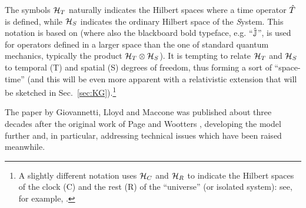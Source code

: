 The symbols $\mathcal{H}_T$ %
naturally indicates
the Hilbert spaces where a time operator $\hat{T}$ is defined,
while $\mathcal{H}_S$ indicates
the ordinary Hilbert space of the \emph{S}ystem.
This notation is based on \citereset\cite{Lloyd:Time}
(where also the blackboard bold typeface, e.g. ``$\hat{\mathbb{J}}$'',
is used for operators defined in a larger space
than the one of standard quantum mechanics,
typically the product $\mathcal{H}_T \otimes \mathcal{H}_S$).
It is tempting to relate $\mathcal{H}_T$ and $\mathcal{H}_S$
to temporal (T) and spatial (S)
degrees of freedom, thus forming a sort of
``space-time'' (and this will be even more apparent
with a relativistic extension that will be sketched in Sec.~\ref{sec:KG}).\footnote{
  A slightly different notation
  uses $\mathcal{H}_C$ and $\mathcal{H}_R$
  to indicate the Hilbert spaces of the clock (C) and the rest (R) of the ``universe''
  (or isolated system):
  see, for example, \cite{Marletto:Evolution}.
}


The paper by Giovannetti, Lloyd and Maccone \citereset\parencite{Lloyd:Time}
was published about three decades after the original work
of Page and Wootters \parencite{PageWootters},
developing the model further and,
in particular,
addressing technical issues which have been raised meanwhile.



